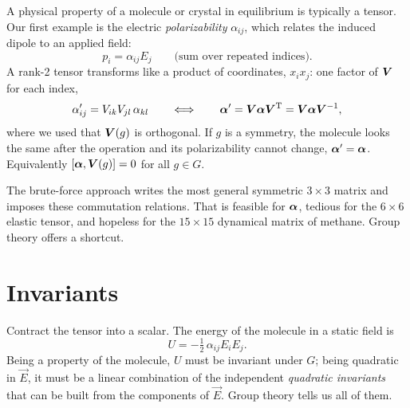 A physical property of a molecule or crystal in equilibrium is typically a tensor.
Our first example is the electric \emph{polarizability} $\alpha_{ij}$, which relates
the induced dipole to an applied field:
\begin{equation}
  p_i=\alpha_{ij}E_j\qquad\text{(sum over repeated indices).}
\end{equation}
A rank-2 tensor transforms like a product of coordinates, $x_ix_j$: one factor of
$\bm{V}$ for each index,
\begin{equation}\label{eq:tensortransf}
  \alpha'_{ij}=V_{ik}V_{jl}\,\alpha_{kl}\qquad\Longleftrightarrow\qquad
  \bm{\alpha}'=\bm{V}\bm{\alpha}\bm{V}^{\mathrm{T}}=\bm{V}\bm{\alpha}\bm{V}^{-1},
\end{equation}
where we used that $\bm{V}(g)$ is orthogonal. If $g$ is a symmetry, the molecule looks
the same after the operation and its polarizability cannot change,
$\bm{\alpha}'=\bm{\alpha}$. Equivalently $[\bm{\alpha},\bm{V}(g)]=0$ for all
$g\in G$.

The brute-force approach writes the most general symmetric $3\times3$ matrix and
imposes these commutation relations. That is feasible for $\bm{\alpha}$, tedious for
the $6\times6$ elastic tensor, and hopeless for the $15\times15$ dynamical matrix of
methane. Group theory offers a shortcut.

\section{Invariants}\label{sec:invariants}

Contract the tensor into a scalar. The energy of the molecule in a static field is
\begin{equation}
  U=-\tfrac12\,\alpha_{ij}E_iE_j .
\end{equation}
Being a property of the molecule, $U$ must be invariant under $G$; being quadratic in
$\vec{E}$, it must be a linear combination of the independent \emph{quadratic
invariants} that can be built from the components of $\vec{E}$. Group theory tells us
all of them.

